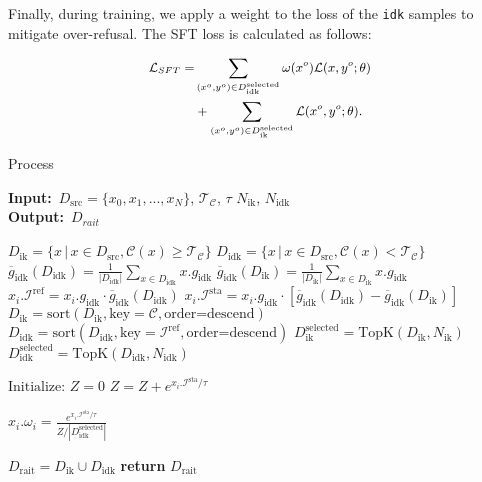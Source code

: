 Finally, during training, we apply a weight to the loss of the \texttt{idk} samples to mitigate over-refusal. The SFT loss is calculated as follows:

\begin{equation}
\small
\label{eq:loss_decomposition}
\begin{aligned}
\mathcal{L}_{SFT} = & \sum\limits_{(x^o, y^o) \in D^{\text{selected}}_{\text{idk}}} \omega(x^o) \mathcal{L}(x, y^o; \theta)\\
&+ \sum\limits_{(x^o, y^o) \in D^{\text{selected}}_{\text{ik}}} \mathcal{L}(x^o, y^o; \theta).
\end{aligned}
\end{equation}

\begin{algorithm}[t]
\caption{\M Process}
\label{alg:RAI_data}
\textbf{Input:}{~$D_{\text{src}} = \{x_{0}, x_{1}, ..., x_{N}\}$}, $\mathcal{T}_{\mathcal{C}}$, $\tau$ $N_{\text{ik}}$, $N_{\text{idk}}$ \\
\textbf{Output:}{~$D_{rait}$}
\begin{algorithmic}[1]
\State $D_{\text{ik}} = \{x \, | \, x \in D_{\text{src}},  \mathcal{C}(x) \geq \mathcal{T}_{\mathcal{C}}\}$
\State $D_{\text{idk}} = \{x \, | \, x \in D_{\text{src}},  \mathcal{C}(x) < \mathcal{T}_{\mathcal{C}}\}$
\State $\overline{g}_{\text{idk}}(D_{\text{idk}}) = \frac{1}{|D_{\text{idk}}|} \sum_{x \in D_{\text{idk}}} x.g_{\text{idk}}$
\State $\overline{g}_{\text{idk}}(D_{\text{ik}}) = \frac{1}{|D_{\text{ik}}|} \sum_{x \in D_{\text{ik}}} x.g_{\text{idk}}$
    \State $x_i.\mathcal{I}^{\text{ref}} = x_i.g_{\text{idk}} \cdot \overline{g}_{\text{idk}}(D_{\text{idk}})$
    \State $x_i.\mathcal{I}^{\text{sta}} = x_i.g_{\text{idk}} \cdot [\overline{g}_{\text{idk}}(D_{\text{idk}}) - \overline{g}_{\text{idk}}(D_{\text{ik}})]$
\EndFor
\State $D_{\text{ik}} = \text{sort}(D_{\text{ik}}, \text{key}=\mathcal{C}, \text{order=descend})$
\State $D_{\text{idk}} = \text{sort}(D_{\text{idk}}, \text{key}=\mathcal{I}^{\text{ref}}, \text{order=descend})$
\State $D_{\text{ik}}^{\text{selected}} = \text{TopK}(D_{\text{ik}}, N_{\text{ik}})$
\State $D_{\text{idk}}^{\text{selected}} = \text{TopK}(D_{\text{idk}}, N_{\text{idk}})$

\State $\text{Initialize: } Z = 0$ 
    \State $Z = Z + e^{x_i.\mathcal{I}^{\text{sta}} / \tau}$
\EndFor

    \State $x_i.\omega_i = \frac{e^{x_i.\mathcal{I}^{\text{sta}} / \tau}}{Z/|D_{\text{idk}}^{\text{selected}}|}$ 
\EndFor

\State $D_{\text{rait}} = D_{\text{ik}} \cup D_{\text{idk}}$
\State \textbf{return} $D_{\text{rait}}$
\end{algorithmic}
\end{algorithm}
